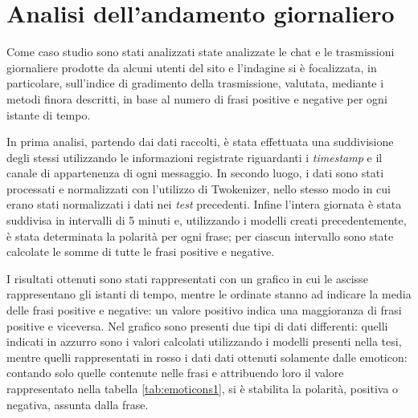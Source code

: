\documentclass[a4paper,12pt,openright,twoside]{report}
\theoremstyle{definition}
\begin{document}

\section{Analisi dell'andamento giornaliero}
\label{sec:andamento}
Come caso studio sono stati analizzati state analizzate le chat e le trasmissioni giornaliere prodotte da alcuni utenti
del sito
e l’indagine si è focalizzata, in particolare, sull’indice di gradimento della trasmissione,  valutata, mediante i metodi finora descritti, in base al numero di frasi positive e negative per ogni istante di tempo.

In prima analisi, partendo dai dati raccolti, è stata effettuata una suddivisione degli stessi utilizzando
le informazioni registrate riguardanti i \emph{timestamp} e il canale di appartenenza di ogni messaggio.
In secondo luogo, i dati sono stati processati e normalizzati con l'utilizzo di Twokenizer, nello stesso modo
in cui erano stati normalizzati i dati nei \emph{test} precedenti.
Infine l'intera giornata è stata suddivisa in intervalli di 5 minuti e, utilizzando i modelli
creati precedentemente, è stata determinata la polarità per ogni frase; per ciascun intervallo sono state calcolate le 
somme di tutte le frasi positive e negative.

I risultati ottenuti sono stati rappresentati con un grafico in cui le ascisse rappresentano gli
istanti di tempo, mentre le ordinate stanno ad indicare la media delle frasi positive e negative:
un valore positivo indica
una maggioranza di frasi positive e viceversa.
Nel grafico sono presenti due tipi di dati differenti: quelli indicati in azzurro sono i valori calcolati
utilizzando i modelli presenti nella tesi, mentre quelli rappresentati in rosso  i dati dati ottenuti solamente
dalle emoticon: contando 
solo quelle contenute nelle frasi e attribuendo loro il valore rappresentato
nella tabella \ref{tab:emoticons1}, si è stabilita la polarità, positiva o negativa, assunta dalla frase.
\end{document}
